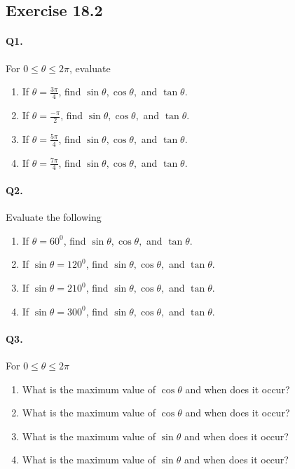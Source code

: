 \documentclass{article}
\begin{document}
\subsection {Exercise 18.2}
\paragraph{Q1.}
For $0\leq\theta\leq2\pi$, evaluate

\begin{enumerate}[label=\alph*)]
  \item If $\theta=\frac{3\pi}{4}$, find $\sin\theta, \cos\theta,$ and $\tan\theta$.
  \item If $\theta=\frac{-\pi}{2}$, find $\sin\theta, \cos\theta,$ and $\tan\theta$.
  \item If $\theta=\frac{5\pi}{4}$, find $\sin\theta, \cos\theta,$ and $\tan\theta$.
  \item If $\theta=\frac{7\pi}{4}$, find $\sin\theta, \cos\theta,$ and $\tan\theta$.
\end{enumerate}

\paragraph{Q2.}
Evaluate the following

\begin{enumerate}[label=\alph*)]
  \item If $\theta=60^{0}$, find $\sin\theta, \cos\theta,$ and $\tan\theta$.
  \item If $\sin\theta=120^{0}$, find $\sin\theta, \cos\theta,$ and $\tan\theta$.
  \item If $\sin\theta=210^{0}$, find $\sin\theta, \cos\theta,$ and $\tan\theta$.
  \item If $\sin\theta=300^{0}$, find $\sin\theta, \cos\theta,$ and $\tan\theta$.
\end{enumerate}

\paragraph{Q3.}
For $0\leq\theta\leq2\pi$

\begin{enumerate}[label=\alph*)]
  \item What is the maximum value of $\cos\theta$ and when does it occur?
  \item What is the maximum value of $\cos\theta$ and when does it occur?
  \item What is the maximum value of $\sin\theta$ and when does it occur?
  \item What is the maximum value of $\sin\theta$ and when does it occur?
\end{enumerate}
\end{document}
